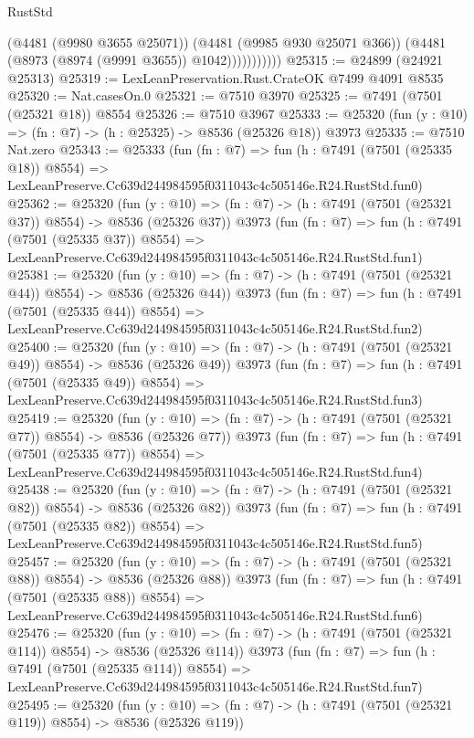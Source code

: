 \begin{lexlean}{RustStd}
\begin{coremodule}
                      (@4481 (@9980 @3655 @25071))
                      (@4481 (@9985 @930 @25071 @366))
                      (@4481 (@8973 (@8974 (@9991 @3655)) @1042)))))))))))
@25315 := @24899 (@24921 @25313)
@25319 := LexLeanPreservation.Rust.CrateOK @7499 @4091 @8535
@25320 := Nat.casesOn.{0}
@25321 := @7510 @3970
@25325 := @7491 (@7501 (@25321 @18)) @8554
@25326 := @7510 @3967
@25333 := @25320 (fun (y : @10) => (fn : @7) -> (h : @25325) -> @8536 (@25326 @18)) @3973
@25335 := @7510 Nat.zero
@25343 := @25333
    (fun (fn : @7) =>
    fun (h : @7491 (@7501 (@25335 @18)) @8554) =>
    LexLeanPreserve.Cc639d244984595f0311043c4c505146e.R24.RustStd.fun0)
@25362 := @25320
    (fun (y : @10) => (fn : @7) -> (h : @7491 (@7501 (@25321 @37)) @8554) -> @8536 (@25326 @37))
    @3973
    (fun (fn : @7) =>
    fun (h : @7491 (@7501 (@25335 @37)) @8554) =>
    LexLeanPreserve.Cc639d244984595f0311043c4c505146e.R24.RustStd.fun1)
@25381 := @25320
    (fun (y : @10) => (fn : @7) -> (h : @7491 (@7501 (@25321 @44)) @8554) -> @8536 (@25326 @44))
    @3973
    (fun (fn : @7) =>
    fun (h : @7491 (@7501 (@25335 @44)) @8554) =>
    LexLeanPreserve.Cc639d244984595f0311043c4c505146e.R24.RustStd.fun2)
@25400 := @25320
    (fun (y : @10) => (fn : @7) -> (h : @7491 (@7501 (@25321 @49)) @8554) -> @8536 (@25326 @49))
    @3973
    (fun (fn : @7) =>
    fun (h : @7491 (@7501 (@25335 @49)) @8554) =>
    LexLeanPreserve.Cc639d244984595f0311043c4c505146e.R24.RustStd.fun3)
@25419 := @25320
    (fun (y : @10) => (fn : @7) -> (h : @7491 (@7501 (@25321 @77)) @8554) -> @8536 (@25326 @77))
    @3973
    (fun (fn : @7) =>
    fun (h : @7491 (@7501 (@25335 @77)) @8554) =>
    LexLeanPreserve.Cc639d244984595f0311043c4c505146e.R24.RustStd.fun4)
@25438 := @25320
    (fun (y : @10) => (fn : @7) -> (h : @7491 (@7501 (@25321 @82)) @8554) -> @8536 (@25326 @82))
    @3973
    (fun (fn : @7) =>
    fun (h : @7491 (@7501 (@25335 @82)) @8554) =>
    LexLeanPreserve.Cc639d244984595f0311043c4c505146e.R24.RustStd.fun5)
@25457 := @25320
    (fun (y : @10) => (fn : @7) -> (h : @7491 (@7501 (@25321 @88)) @8554) -> @8536 (@25326 @88))
    @3973
    (fun (fn : @7) =>
    fun (h : @7491 (@7501 (@25335 @88)) @8554) =>
    LexLeanPreserve.Cc639d244984595f0311043c4c505146e.R24.RustStd.fun6)
@25476 := @25320
    (fun (y : @10) => (fn : @7) -> (h : @7491 (@7501 (@25321 @114)) @8554) -> @8536 (@25326 @114))
    @3973
    (fun (fn : @7) =>
    fun (h : @7491 (@7501 (@25335 @114)) @8554) =>
    LexLeanPreserve.Cc639d244984595f0311043c4c505146e.R24.RustStd.fun7)
@25495 := @25320
    (fun (y : @10) => (fn : @7) -> (h : @7491 (@7501 (@25321 @119)) @8554) -> @8536 (@25326 @119))

\end{coremodule}
\end{lexlean}
